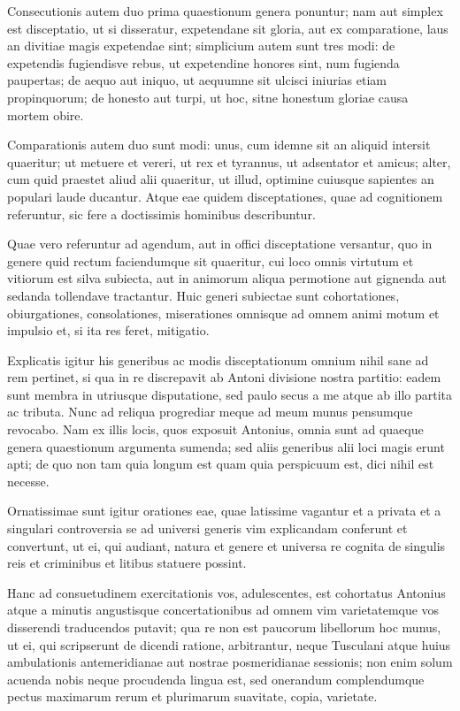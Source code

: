  Consecutionis autem duo prima quaestionum genera ponuntur; nam aut simplex est disceptatio, ut si disseratur, expetendane sit gloria, aut ex comparatione, laus an divitiae magis expetendae sint; simplicium autem sunt tres modi: de expetendis fugiendisve rebus, ut expetendine honores sint, num fugienda paupertas; de aequo aut iniquo, ut aequumne sit ulcisci iniurias etiam propinquorum; de honesto aut turpi, ut hoc, sitne honestum gloriae causa mortem obire.

 Comparationis autem duo sunt modi: unus, cum idemne sit an aliquid intersit quaeritur; ut metuere et vereri, ut rex et tyrannus, ut adsentator et amicus; alter, cum quid praestet aliud alii quaeritur, ut illud, optimine cuiusque sapientes an populari laude ducantur. Atque eae quidem disceptationes, quae ad cognitionem referuntur, sic fere a doctissimis hominibus describuntur.

 Quae vero referuntur ad agendum, aut in offici disceptatione versantur, quo in genere quid rectum faciendumque sit quaeritur, cui loco omnis virtutum et vitiorum est silva subiecta, aut in animorum aliqua permotione aut gignenda aut sedanda tollendave tractantur. Huic generi subiectae sunt cohortationes, obiurgationes, consolationes, miserationes omnisque ad omnem animi motum et impulsio et, si ita res feret, mitigatio.

 Explicatis igitur his generibus ac modis disceptationum omnium nihil sane ad rem pertinet, si qua in re discrepavit ab Antoni divisione nostra partitio: eadem sunt membra in utriusque disputatione, sed paulo secus a me atque ab illo partita ac tributa. Nunc ad reliqua progrediar meque ad meum munus pensumque revocabo. Nam ex illis locis, quos exposuit Antonius, omnia sunt ad quaeque genera quaestionum argumenta sumenda; sed aliis generibus alii loci magis erunt apti; de quo non tam quia longum est quam quia perspicuum est, dici nihil est necesse.

 Ornatissimae sunt igitur orationes eae, quae latissime vagantur et a privata et a singulari controversia se ad universi generis vim explicandam conferunt et convertunt, ut ei, qui audiant, natura et genere et universa re cognita de singulis reis et criminibus et litibus statuere possint.

 Hanc ad consuetudinem exercitationis vos, adulescentes, est cohortatus Antonius atque a minutis angustisque concertationibus ad omnem vim varietatemque vos disserendi traducendos putavit; qua re non est paucorum libellorum hoc munus, ut ei, qui scripserunt de dicendi ratione, arbitrantur, neque Tusculani atque huius ambulationis antemeridianae aut nostrae posmeridianae sessionis; non enim solum acuenda nobis neque procudenda lingua est, sed onerandum complendumque pectus maximarum rerum et plurimarum suavitate, copia, varietate.


